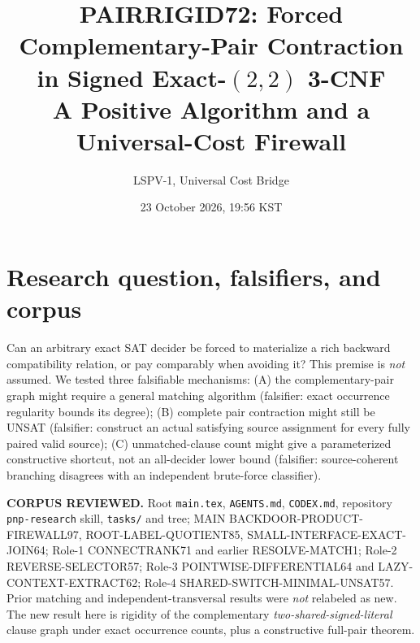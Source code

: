 \documentclass[11pt]{article}
\title{PAIRRIGID72: Forced Complementary-Pair Contraction in Signed Exact-$(2,2)$ 3-CNF\\A Positive Algorithm and a Universal-Cost Firewall}
\author{LSPV-1, Universal Cost Bridge}
\date{23 October 2026, 19:56 KST}
\begin{document}
\maketitle
\begin{center}
\end{center}
\section{Research question, falsifiers, and corpus}
Can an arbitrary exact SAT decider be forced to materialize a rich backward compatibility relation, or pay comparably when avoiding it? This premise is \emph{not} assumed. We tested three falsifiable mechanisms:
(A) the complementary-pair graph might require a general matching algorithm (falsifier: exact occurrence regularity bounds its degree);
(B) complete pair contraction might still be UNSAT (falsifier: construct an actual satisfying source assignment for every fully paired valid source);
(C) unmatched-clause count might give a parameterized constructive shortcut, not an all-decider lower bound (falsifier: source-coherent branching disagrees with an independent brute-force classifier).
\par\noindent\textbf{CORPUS REVIEWED.} Root \texttt{main.tex}, \texttt{AGENTS.md}, \texttt{CODEX.md}, repository \texttt{pnp-research} skill, \texttt{tasks/} and tree; MAIN BACKDOOR-PRODUCT-FIREWALL97, ROOT-LABEL-QUOTIENT85, SMALL-INTERFACE-EXACT-JOIN64; Role-1 CONNECTRANK71 and earlier RESOLVE-MATCH1; Role-2 REVERSE-SELECTOR57; Role-3 POINTWISE-DIFFERENTIAL64 and LAZY-CONTEXT-EXTRACT62; Role-4 SHARED-SWITCH-MINIMAL-UNSAT57. Prior matching and independent-transversal results were \emph{not} relabeled as new. The new result here is rigidity of the complementary \emph{two-shared-signed-literal} clause graph under exact occurrence counts, plus a constructive full-pair theorem.
\end{document}
